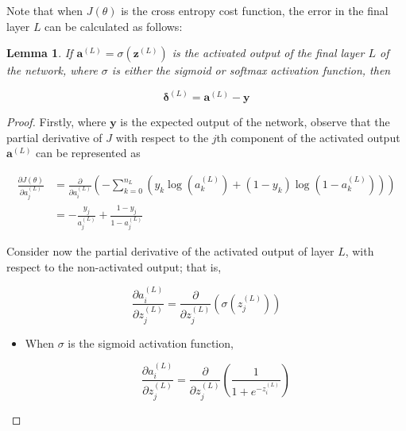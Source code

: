 \documentclass{article}
\newtheorem{lemma}{Lemma}
\begin{document}
        Note that when $J(\theta)$ is the cross entropy cost function, the error in the final layer $L$ can be calculated as follows:
        
        \begin{lemma}
            If $\mathbf{a}^{(L)} = \sigma(\mathbf{z}^{(L)})$ is the activated output of the final layer $L$ of the network, where $\sigma$ is either the sigmoid or softmax activation function, then
            
            $$
            \mathbf{\delta}^{(L)} = \mathbf{a}^{(L)} - \mathbf{y}
            $$
            
        \end{lemma}
        
        
        \begin{proof}
            
            Firstly, where $\mathbf{y}$ is the expected output of the network, observe that the partial derivative of $J$ with respect to the $j$th component of the activated output $\mathbf{a}^{(L)}$ can be represented as
                    
            $$ \begin{aligned}
            \frac{\partial J(\theta)}{\partial a^{(L)}_j}
            &= \frac{\partial}{\partial a^{(L)}_i} \left( - \sum_{k=0}^{n_L} \left( y_k \log(a^{(L)}_k) + (1 - y_k) \log(1 - a^{(L)}_k) \right) \right) \\
            &= - \frac{y_j}{a^{(L)}_j} + \frac{1 - y_j}{1 - a^{(L)}_j}
            \end{aligned} $$
            
            Consider now the partial derivative of the activated output of layer $L$, with respect to the non-activated output; that is,
            
            $$
            \frac{\partial a^{(L)}_i}{\partial z^{(L)}_j} = \frac{\partial}{\partial z^{(L)}_j} \left( \sigma(z^{(L)}_j) \right)
            $$
            
             
            \begin{itemize}
                
                \item When $\sigma$ is the sigmoid activation function,
            
                $$
                \frac{\partial a^{(L)}_i}{\partial z^{(L)}_j} = \frac{\partial}{\partial z^{(L)}_j} \left( \frac{1}{1 + e^{-z^{(L)}_i}} \right)
                $$
                

\end{itemize}
\end{proof}
\end{document}
